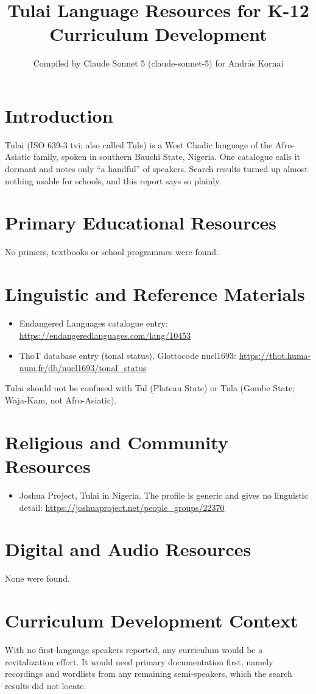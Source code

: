\documentclass[12pt]{article}
\title{Tulai Language Resources for K-12 Curriculum Development}
\author{Compiled by Claude Sonnet 5 (claude-sonnet-5) for Andr\'as Kornai}
\date{}
\begin{document}
\maketitle

\section{Introduction}
Tulai (ISO 639-3 tvi; also called Tule) is a West Chadic language of the Afro-Asiatic family, spoken in southern Bauchi State, Nigeria. One catalogue calls it dormant and notes only ``a handful'' of speakers. Search results turned up almost nothing usable for schools, and this report says so plainly.

\section{Primary Educational Resources}
No primers, textbooks or school programmes were found.

\section{Linguistic and Reference Materials}
\begin{itemize}
\item Endangered Languages catalogue entry: \url{https://endangeredlanguages.com/lang/10453}
\item ThoT database entry (tonal status), Glottocode nucl1693: \url{https://thot.huma-num.fr/db/nucl1693/tonal_status}
\end{itemize}
Tulai should not be confused with Tal (Plateau State) or Tula (Gombe State; Waja-Kam, not Afro-Asiatic).

\section{Religious and Community Resources}
\begin{itemize}
\item Joshua Project, Tulai in Nigeria. The profile is generic and gives no linguistic detail: \url{https://joshuaproject.net/people_groups/22370}
\end{itemize}

\section{Digital and Audio Resources}
None were found.

\section{Curriculum Development Context}
With no first-language speakers reported, any curriculum would be a revitalization effort. It would need primary documentation first, namely recordings and wordlists from any remaining semi-speakers, which the search results did not locate.
\end{document}
